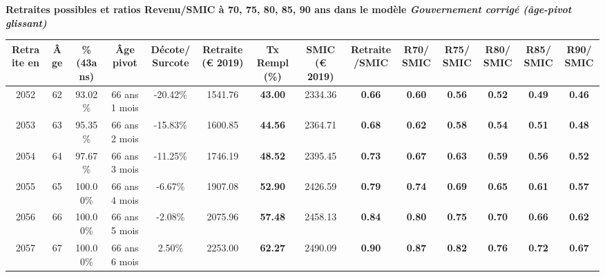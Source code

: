  \vspace{0.1cm} 
{\bf \noindent Retraites possibles et ratios Revenu/SMIC à 70, 75, 80, 85, 90 ans dans le modèle \emph{Gouvernement corrigé (âge-pivot glissant)}}  
 
\begin{adjustbox}{max width=\textwidth} 
\begin{tabular}[htb]{|c|c||c|c|c||c|c||c|c||c|c|c|c|c|} 
\hline 
 Retraite en &  Âge &  \%(43ans) &  Âge pivot &  Décote/Surcote &  Retraite (\euro{} 2019) &  Tx Rempl(\%) &  SMIC (\euro{} 2019) &  Retraite/SMIC &  R70/SMIC &  R75/SMIC &  R80/SMIC &  R85/SMIC &  R90/SMIC \\ 
\hline \hline 
 2052 &  62 &  93.02\% &  66 ans 1 mois &  -20.42\% &  1541.76 &  {\bf 43.00} &  2334.36 &  {\bf {\color{red} 0.66}} &  {\bf {\color{red} 0.60}} &  {\bf {\color{red} 0.56}} &  {\bf {\color{red} 0.52}} &  {\bf {\color{red} 0.49}} &  {\bf {\color{red} 0.46}} \\ 
\hline 
 2053 &  63 &  95.35\% &  66 ans 2 mois &  -15.83\% &  1600.85 &  {\bf 44.56} &  2364.71 &  {\bf {\color{red} 0.68}} &  {\bf {\color{red} 0.62}} &  {\bf {\color{red} 0.58}} &  {\bf {\color{red} 0.54}} &  {\bf {\color{red} 0.51}} &  {\bf {\color{red} 0.48}} \\ 
\hline 
 2054 &  64 &  97.67\% &  66 ans 3 mois &  -11.25\% &  1746.19 &  {\bf 48.52} &  2395.45 &  {\bf {\color{red} 0.73}} &  {\bf {\color{red} 0.67}} &  {\bf {\color{red} 0.63}} &  {\bf {\color{red} 0.59}} &  {\bf {\color{red} 0.56}} &  {\bf {\color{red} 0.52}} \\ 
\hline 
 2055 &  65 &  100.00\% &  66 ans 4 mois &  -6.67\% &  1907.08 &  {\bf 52.90} &  2426.59 &  {\bf {\color{red} 0.79}} &  {\bf {\color{red} 0.74}} &  {\bf {\color{red} 0.69}} &  {\bf {\color{red} 0.65}} &  {\bf {\color{red} 0.61}} &  {\bf {\color{red} 0.57}} \\ 
\hline 
 2056 &  66 &  100.00\% &  66 ans 5 mois &  -2.08\% &  2075.96 &  {\bf 57.48} &  2458.13 &  {\bf {\color{red} 0.84}} &  {\bf {\color{red} 0.80}} &  {\bf {\color{red} 0.75}} &  {\bf {\color{red} 0.70}} &  {\bf {\color{red} 0.66}} &  {\bf {\color{red} 0.62}} \\ 
\hline 
 2057 &  67 &  100.00\% &  66 ans 6 mois &  2.50\% &  2253.00 &  {\bf 62.27} &  2490.09 &  {\bf {\color{red} 0.90}} &  {\bf {\color{red} 0.87}} &  {\bf {\color{red} 0.82}} &  {\bf {\color{red} 0.76}} &  {\bf {\color{red} 0.72}} &  {\bf {\color{red} 0.67}} \\ 
\hline 
\hline 
\end{tabular} 
\end{adjustbox} 
 
